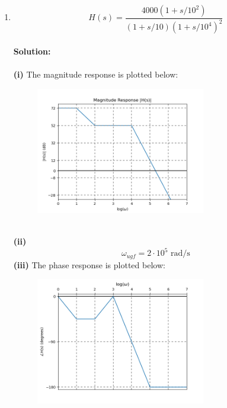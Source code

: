 \documentclass{article}
\begin{document}
\begin{enumerate}[label=\textbf{(\alph*)}]
\begin{figure}[!h]
    \end{figure}
    \newpage
    \item $$H(s) = \frac{4000(1+s/10^2)}{(1+s/10)(1+s/10^4)^2}$$
    \\ \textbf{Solution:}\\ \\
    \textbf{(i)} The magnitude response is plotted below:
    \begin{figure}[!h]
    \centering
    \includegraphics[width=0.7\textwidth]{figures/ece342_cc_mag_c.png}
    \end{figure} \\
    \textbf{(ii)} 
    $$\boxed{\omega_{ugf} = 2 \cdot 10^5 \text{ rad/s}}$$
    \newpage
    \textbf{(iii)} The phase response is plotted below:
    \begin{figure}[!h]
    \centering
    \includegraphics[width=0.7\textwidth]{figures/cc_phase_c.png}
    \end{figure}
\end{enumerate}
\newpage
\end{document}
